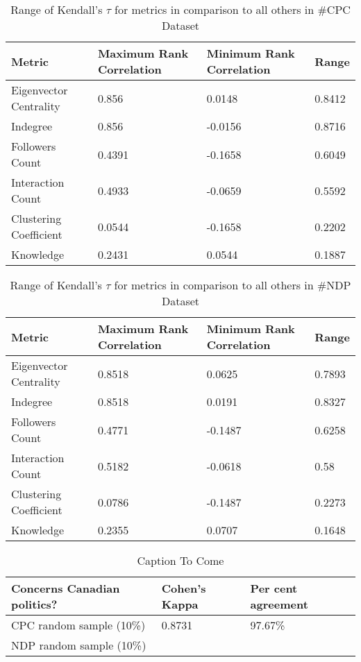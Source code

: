 \documentclass[a4paper,12pt]{article}
\begin{document}
\begin{table}[position specifier]\footnotesize
  \centering
  \begin{tabular}{| l | l | l | l |}
    \hline
    Metric & Maximum Rank Correlation & Minimum Rank Correlation & Range \\ \hline
    Eigenvector Centrality & 0.856 & 0.0148 & 0.8412 \\ \hline
    Indegree & 0.856 & -0.0156 & 0.8716 \\ \hline
    Followers Count & 0.4391 & -0.1658 & 0.6049 \\ \hline
    Interaction Count & 0.4933 & -0.0659 & 0.5592 \\ \hline
    Clustering Coefficient & 0.0544 & -0.1658 & 0.2202 \\ \hline
    Knowledge & 0.2431 & 0.0544 & 0.1887 \\ \hline
    \hline
  \end{tabular}
  \caption{Range of Kendall's $\tau$ for metrics in comparison to all others in \#CPC Dataset}
  \label{tab:cpc_ranges}
\end{table}


\begin{table}[position specifier]\footnotesize
  \centering
  \begin{tabular}{| l | l | l | l |}
    \hline
    Metric & Maximum Rank Correlation & Minimum Rank Correlation & Range \\ \hline
    Eigenvector Centrality & 0.8518 & 0.0625 & 0.7893 \\ \hline
    Indegree & 0.8518 & 0.0191 & 0.8327 \\ \hline
    Followers Count & 0.4771 & -0.1487 & 0.6258 \\ \hline
    Interaction Count & 0.5182 & -0.0618 & 0.58 \\ \hline
    Clustering Coefficient & 0.0786 & -0.1487 & 0.2273 \\ \hline
    Knowledge & 0.2355 & 0.0707 & 0.1648 \\ \hline
    \hline
  \end{tabular}
  \caption{Range of Kendall's $\tau$ for metrics in comparison to all others in \#NDP Dataset}
  \label{tab:ndp_ranges}
\end{table}
\clearpage


\clearpage
\begin{table}[position specifier]\footnotesize
  \centering
  \begin{tabular}{| l | l | l |}
    \hline
    Concerns Canadian politics? & Cohen's Kappa & Per cent agreement \\ \hline
    CPC random sample (10\%) & 0.8731 & 97.67\% \\ \hline
    NDP random sample (10\%) & & \\ \hline
    \hline
  \end{tabular}
  \caption{Caption To Come}
  \label{tab:elizabeth_table_one}
\end{table}
\end{document}
